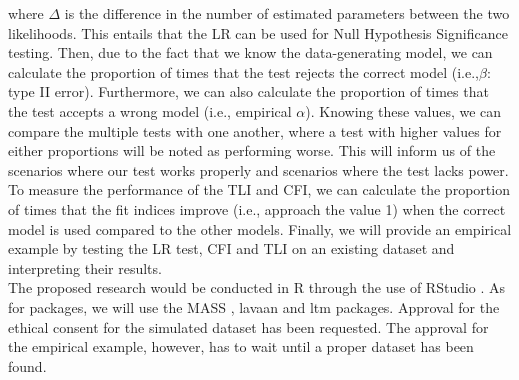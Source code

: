 \documentclass{article}
\begin{document}
where $\Delta$ is the difference in the number of estimated parameters between the two likelihoods. This entails that the LR can be used for Null Hypothesis Significance testing. Then, due to the fact that we know the data-generating model, we can calculate the proportion of times that the test rejects the correct model (i.e.,$\beta$: type II error). Furthermore, we can also calculate the proportion of times that the test accepts a wrong model (i.e., empirical $\alpha$). Knowing these values, we can compare the multiple tests with one another, where a test with higher values for either proportions will be noted as performing worse. This will inform us of the scenarios where our test works properly and scenarios where the test lacks power. 
To measure the performance of the TLI and CFI, we can calculate the proportion of times that the fit indices improve (i.e., approach the value 1) when the correct model is used compared to the other models. Finally, we will provide an empirical example by testing the LR test, CFI and TLI on an existing dataset and interpreting their results. \\
\indent The proposed research would be conducted in R \autocite{R} through the use of RStudio \autocite{Rstudio}. As for packages, we will use the MASS \autocite{mass}, lavaan \autocite{lavaan} and ltm \autocite{ltmpack} packages. Approval for the ethical consent for the simulated dataset has been requested. The approval for the empirical example, however, has to wait until a proper dataset has been found.


\nocite{*}

\newpage
\printbibliography
\end{document}
